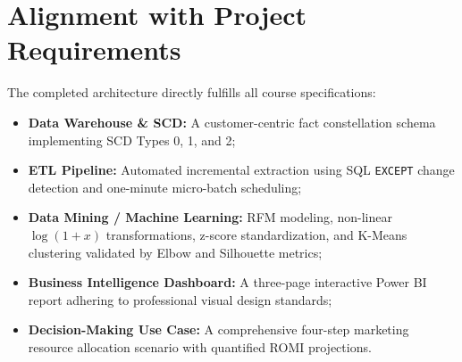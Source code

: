 \section{Alignment with Project Requirements}
The completed architecture directly fulfills all course specifications:
\begin{itemize}
    \item \textbf{Data Warehouse \& SCD:} A customer-centric fact constellation schema implementing SCD Types 0, 1, and 2;
    \item \textbf{ETL Pipeline:} Automated incremental extraction using SQL \texttt{EXCEPT} change detection and one-minute micro-batch scheduling;
    \item \textbf{Data Mining / Machine Learning:} RFM modeling, non-linear $\log(1+x)$ transformations, z-score standardization, and K-Means clustering validated by Elbow and Silhouette metrics;
    \item \textbf{Business Intelligence Dashboard:} A three-page interactive Power BI report adhering to professional visual design standards;
    \item \textbf{Decision-Making Use Case:} A comprehensive four-step marketing resource allocation scenario with quantified ROMI projections.
\end{itemize}
